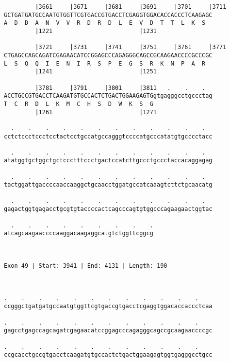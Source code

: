 \documentclass{article}
\begin{document}
\begin{Verbatim}
         |3661     |3671     |3681     |3691     |3701     |3711
GCTGATGATGCCAATGTGGTTCGTGACCGTGACCTCGAGGTGGACACCACCCTCAAGAGC
A  D  D  A  N  V  V  R  D  R  D  L  E  V  D  T  T  L  K  S  
         |1221                         |1231                
  
         |3721     |3731     |3741     |3751     |3761     |3771
CTGAGCCAGCAGATCGAGAACATCCGGAGCCCAGAGGGCAGCCGCAAGAACCCCGCCCGC
L  S  Q  Q  I  E  N  I  R  S  P  E  G  S  R  K  N  P  A  R  
         |1241                         |1251                
  
         |3781     |3791     |3801     |3811   .    .    .  
ACCTGCCGTGACCTCAAGATGTGCCACTCTGACTGGAAGAGTGgtgagggcctgccctag
T  C  R  D  L  K  M  C  H  S  D  W  K  S  G                 
         |1261                         |1271                
  
  .    .    .    .    .    .    .    .    .    .    .    .  
cctctccctccctcctactcctgccatgccagggtccccatgcccatatgtgcccctacc
                                                            
  .    .    .    .    .    .    .    .    .    .    .    .  
atatggtgctggctgctccctttccctgactccatcttgccctgccctaccacaggagag
                                                            
  .    .    .    .    .    .    .    .    .    .    .    .  
tactggattgaccccaaccaaggctgcaacctggatgccatcaaagtcttctgcaacatg
                                                            
  .    .    .    .    .    .    .    .    .    .    .    .  
gagactggtgagacctgcgtgtaccccactcagcccagtgtggcccagaagaactggtac
                                                            
  .    .    .    .    .    .    .    .    .
atcagcaagaaccccaaggacaagaggcatgtctggttcggcg
                                           
                                           
 
Exon 49 | Start: 3941 | End: 4131 | Length: 190



.    .    .    .    .    .    .    .    .    .    .    .    
ccgggctgatgatgccaatgtggttcgtgaccgtgacctcgaggtggacaccaccctcaa
                                                            
.    .    .    .    .    .    .    .    .    .    .    .    
gagcctgagccagcagatcgagaacatccggagcccagagggcagccgcaagaaccccgc
                                                            
.    .    .    .    .    .    .    .    .    .    .    .    
ccgcacctgccgtgacctcaagatgtgccactctgactggaagagtggtgagggcctgcc
                                                            

\end{Verbatim}
\end{document}
